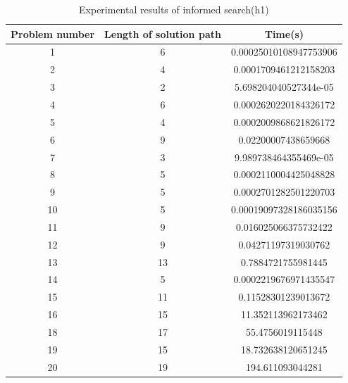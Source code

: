 \documentclass{article}
\begin{document}
\begin{table}[H]
\caption{Experimental results of informed search(h1)}
    \begin{tabular}{ccc}
    \toprule
    Problem number & Length of solution path & Time(s)               \\
    \midrule
    1         & 6                       & 0.00025010108947753906  \\
    2         & 4                       & 0.0001709461212158203 \\
    3         & 2                       & 5.698204040527344e-05 \\
    4         & 6                       & 0.0002620220184326172 \\
    5         & 4                       & 0.0002009868621826172 \\
    6         & 9                       & 0.02200007438659668   \\
    7         & 3                       & 9.989738464355469e-05   \\
    8         & 5                       & 0.0002110004425048828 \\
    9         & 5                       & 0.0002701282501220703 \\
    10        & 5                       & 0.00019097328186035156     \\
    11        & 9                       & 0.016025066375732422   \\
    12        & 9                       & 0.04271197319030762   \\
    13        & 13                      & 0.7884721755981445    \\
    14        & 5                       & 0.0002219676971435547 \\
    15        & 11                      & 0.11528301239013672   \\
    16        & 15                      & 11.352113962173462     \\
    18        & 17                      & 55.4756019115448     \\
    19        & 15                      & 18.732638120651245     \\
    20        & 19                      & 194.611093044281    \\
    \bottomrule
    \end{tabular}
\end{table}
\end{document}
